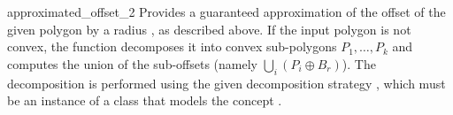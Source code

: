 \begin{ccRefFunction}{approximated_offset_2}
   {Provides a guaranteed approximation of the offset of the given polygon
     by a radius , as described above.
    If the input polygon  is not convex, the function
    decomposes it into convex sub-polygons $P_1, \ldots, P_k$ and computes
    the union of the sub-offsets (namely $\bigcup_{i}{(P_i \oplus B_r)}$).
    The decomposition is performed using the given decomposition strategy
    , which must be an instance of a class that models the
    concept .
    }

\end{ccRefFunction}

\ccRefPageEnd
